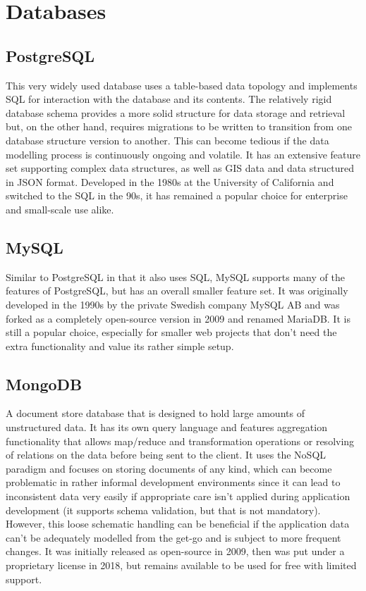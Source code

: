 \section{Databases}



\subsection{PostgreSQL}

This very widely used database uses a table-based data topology and implements \ac{SQL} for interaction with the database and its contents. The relatively rigid database schema provides a more solid structure for data storage and retrieval but, on the other hand, requires migrations to be written to transition from one database structure version to another. This can become tedious if the data modelling process is continuously ongoing and volatile. It has an extensive feature set supporting complex data structures, as well as \ac{GIS} data and data structured in \ac{JSON} format. Developed in the 1980s at the University of California and switched to the \ac{SQL} in the 90s, it has remained a popular choice for enterprise and small-scale use alike.

\subsection{MySQL}

Similar to PostgreSQL in that it also uses \ac{SQL}, MySQL supports many of the features of PostgreSQL, but has an overall smaller feature set. It was originally developed in the 1990s by the private Swedish company MySQL AB and was forked as a completely open-source version in 2009 and renamed MariaDB. It is still a popular choice, especially for smaller web projects that don't need the extra functionality and value its rather simple setup.

\subsection{MongoDB}

A document store database that is designed to hold large amounts of unstructured data. It has its own query language and features aggregation functionality that allows map/reduce and transformation operations or resolving of relations on the data before being sent to the client. It uses the \ac{NoSQL} paradigm and focuses on storing documents of any kind, which can become problematic in rather informal development environments since it can lead to inconsistent data very easily if appropriate care isn't applied during application development (it supports schema validation, but that is not mandatory). However, this loose schematic handling can be beneficial if the application data can't be adequately modelled from the get-go and is subject to more frequent changes. It was initially released as open-source in 2009, then was put under a proprietary license in 2018, but remains available to be used for free with limited support.


